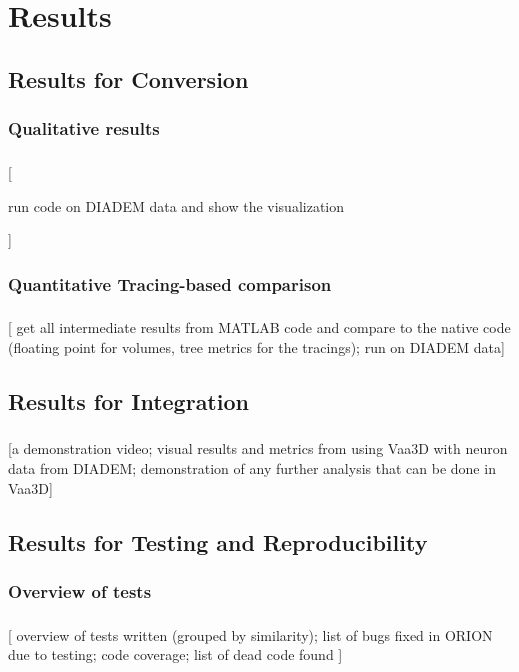\documentclass{beamer}
\newcommand{\tmetrics}[1]{#1}
\newcommand{\tmetrics}[1]{\textcolor{tmetrics}{#1}}
\begin{document}
\section{Results}

\subsection{Results for Conversion}

\subsubsection{Qualitative results}
\begin{frame}\frametitle{\subsecname}
	[
		\tmetrics{
			run code on DIADEM data and show the
			visualization
		}
	]
\end{frame}

\subsubsection{Quantitative Tracing-based comparison}
\begin{frame}\frametitle{\subsecname}
	[ get all intermediate results from MATLAB code and
	compare to the native code (floating point for volumes,
	tree metrics for the tracings); run on DIADEM data]
\end{frame}

\subsection{Results for Integration}
\begin{frame}\frametitle{\subsecname}
	[\tmetrics{a demonstration video; visual results and metrics from using
			Vaa3D with neuron data from DIADEM; demonstration of any further analysis
	that can be done in Vaa3D}]

\end{frame}

\subsection{Results for Testing and Reproducibility}

\subsubsection{Overview of tests}
\begin{frame}\frametitle{\subsubsecname}
	[
		overview of tests written (grouped by similarity);
		list of bugs fixed in ORION due to testing;
		code coverage; list of dead code found
	]
\end{frame}
\end{document}
